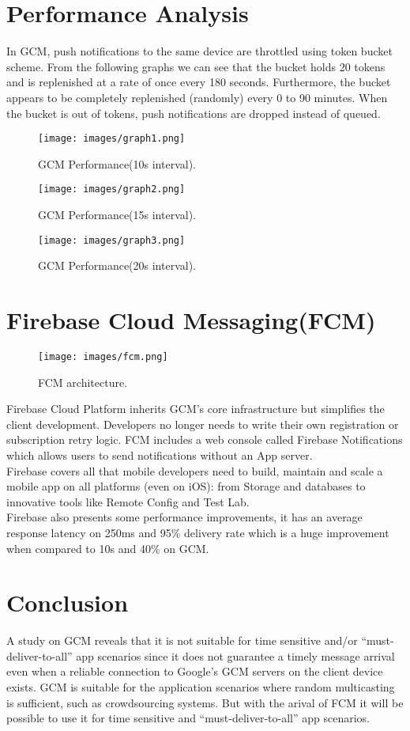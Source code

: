 \section{Performance Analysis}
In GCM, push notifications to the same device are throttled using token bucket scheme. From the following graphs we can see that the bucket holds 20 tokens and is replenished at a rate of once every 180 seconds. Furthermore, the bucket appears to be completely replenished (randomly) every 0 to 90 minutes. When the bucket is out of tokens, push notifications are dropped instead of queued.
\begin{figure}[h]
\centering
\texttt{[image: images/graph1.png]}
\caption{\label{fig:g1}GCM Performance(10s interval).}
\end{figure}
\begin{figure}[h]
\centering
\texttt{[image: images/graph2.png]}
\caption{\label{fig:g2}GCM Performance(15s interval).}
\end{figure}
\begin{figure}[h]
\centering
\texttt{[image: images/graph3.png]}
\caption{\label{fig:g3}GCM Performance(20s interval).}
\end{figure}
\section{Firebase Cloud Messaging(FCM)}
\begin{figure}[!htb]
\centering
\texttt{[image: images/fcm.png]}
\caption{\label{fig:fcm}FCM architecture.}
\end{figure}
Firebase Cloud Platform inherits GCM’s core infrastructure but simplifies the client development. Developers no longer needs to write their own registration or subscription retry logic. FCM includes a web console called Firebase Notifications which allows users to send notifications without an App server.\\
Firebase covers all that mobile developers need to build, maintain and scale a mobile app on all platforms (even on iOS): from Storage and databases to innovative tools like Remote Config and Test Lab.\\
Firebase also presents some performance improvements, it has an average response latency on 250ms and  95\% delivery rate which is a huge improvement when compared to 10s and 40\% on GCM.
\section{Conclusion}
A study on GCM reveals that it is not suitable for time sensitive and/or “must-deliver-to-all” app
scenarios since it does not guarantee a timely message arrival even when a reliable
connection to Google’s GCM servers on the client device exists. GCM is suitable for the application scenarios
where random multicasting is sufficient, such as crowdsourcing
systems. But with the arival of FCM it will be possible to use it for time sensitive and “must-deliver-to-all” app
scenarios.   



